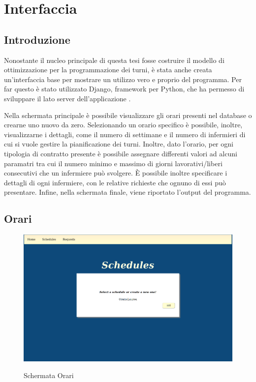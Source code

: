 \chapter{Interfaccia}\label{ch:chapter4}

\section{Introduzione}
Nonostante il nucleo principale di questa tesi fosse costruire il modello di ottimizzazione per la programmazione dei turni, è stata anche creata un'interfaccia base per mostrare un utilizzo vero e proprio del programma.
Per far questo è stato utilizzato Django, framework per Python, che ha permesso di sviluppare il lato server dell'applicazione \cite{ref:Django}.

Nella schermata principale è possibile visualizzare gli orari presenti nel database o crearne uno nuovo da zero. Selezionando un orario specifico è possibile, inoltre, visualizzarne i dettagli, come il numero di settimane e il numero di infermieri di cui si vuole gestire la pianificazione dei turni.
Inoltre, dato l'orario, per ogni tipologia di contratto presente è possibile assegnare differenti valori ad alcuni paramatri tra cui il numero minimo e massimo di giorni lavorativi/liberi consecutivi che un infermiere può svolgere.
È possibile inoltre specificare i dettagli di ogni infermiere, con le relative richieste che ognuno di essi può presentare. Infine, nella schermata finale, viene riportato l'output del programma.

\section{Orari}
\begin{figure}[H]
\begin{center}
  \includegraphics[scale=0.20]{img/Schermate/S1.png}\\
  \caption{Schermata Orari}
\end{center}
\end{figure}

